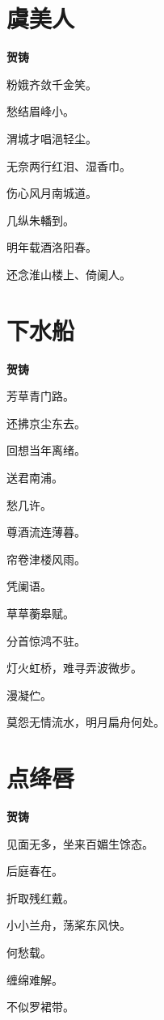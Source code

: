 \documentclass[12pt,a4paper]{ctexbook}
\begin{document}
\section{虞美人}
\textbf{贺铸}\par\vspace{0.5em}
粉娥齐敛千金笑。\par
愁结眉峰小。\par
渭城才唱浥轻尘。\par
无奈两行红泪、湿香巾。\par
伤心风月南城道。\par
几纵朱轓到。\par
明年载酒洛阳春。\par
还念淮山楼上、倚阑人。\par

\section{下水船}
\textbf{贺铸}\par\vspace{0.5em}
芳草青门路。\par
还拂京尘东去。\par
回想当年离绪。\par
送君南浦。\par
愁几许。\par
尊酒流连薄暮。\par
帘卷津楼风雨。\par
凭阑语。\par
草草蘅皋赋。\par
分首惊鸿不驻。\par
灯火虹桥，难寻弄波微步。\par
漫凝伫。\par
莫怨无情流水，明月扁舟何处。\par

\section{点绛唇}
\textbf{贺铸}\par\vspace{0.5em}
见面无多，坐来百媚生馀态。\par
后庭春在。\par
折取残红戴。\par
小小兰舟，荡桨东风快。\par
何愁载。\par
缠绵难解。\par
不似罗裙带。\par
\end{document}
